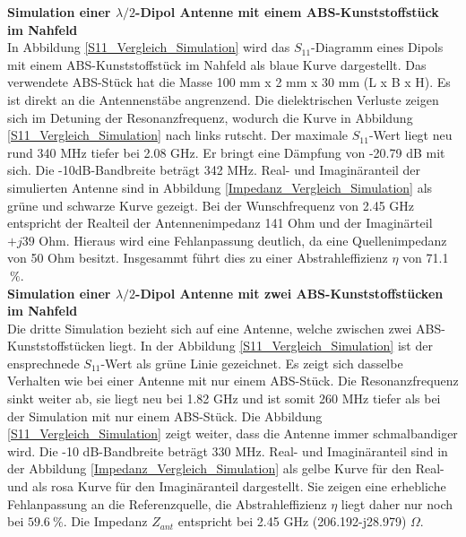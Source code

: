 \textbf{Simulation einer $\lambda/2$-Dipol Antenne mit einem ABS-Kunststoffstück im Nahfeld}\\
In Abbildung \ref{S11_Vergleich_Simulation} wird das $S_{11}$-Diagramm eines Dipols mit einem ABS-Kunststoffstück im Nahfeld als blaue Kurve dargestellt. Das verwendete ABS-Stück hat die Masse 100 mm x 2 mm x 30 mm (L x B x H). Es ist direkt an die Antennenstäbe angrenzend. Die dielektrischen Verluste zeigen sich im Detuning der Resonanzfrequenz, wodurch die Kurve in Abbildung \ref{S11_Vergleich_Simulation} nach links rutscht. Der maximale $S_{11}$-Wert liegt neu rund 340 MHz tiefer bei 2.08 GHz. Er bringt eine Dämpfung von -20.79 dB mit sich. Die -10dB-Bandbreite beträgt 342 MHz. Real- und Imaginäranteil der simulierten Antenne sind in Abbildung \ref{Impedanz_Vergleich_Simulation} als grüne und schwarze Kurve gezeigt. Bei der Wunschfrequenz von 2.45 GHz entspricht der Realteil der Antennenimpedanz 141 Ohm und der Imaginärteil  $+j39$ Ohm. Hieraus wird eine Fehlanpassung deutlich, da eine Quellenimpedanz von 50 Ohm besitzt. Insgesammt führt dies zu einer Abstrahleffizienz $\eta$ von 71.1$\ \%$.\\

\textbf{Simulation einer $\lambda/2$-Dipol Antenne mit zwei ABS-Kunststoffstücken im Nahfeld}\\
Die dritte Simulation bezieht sich auf eine Antenne, welche  zwischen zwei ABS-Kunststoffstücken liegt. In der Abbildung \ref{S11_Vergleich_Simulation} ist der ensprechnede $S_{11}$-Wert als grüne Linie gezeichnet. Es zeigt sich dasselbe Verhalten wie bei einer Antenne mit nur einem ABS-Stück. Die Resonanzfrequenz sinkt weiter ab, sie liegt neu bei 1.82 GHz und ist somit 260 MHz tiefer als bei der Simulation mit nur einem ABS-Stück. Die Abbildung \ref{S11_Vergleich_Simulation} zeigt weiter, dass die Antenne immer schmalbandiger wird. Die -10 dB-Bandbreite beträgt 330 MHz. Real- und Imaginäranteil sind in der Abbildung \ref{Impedanz_Vergleich_Simulation} als gelbe Kurve für den Real- und als rosa Kurve für den Imaginäranteil dargestellt. Sie zeigen eine erhebliche Fehlanpassung an die Referenzquelle, die Abstrahleffizienz $\eta$ liegt daher nur noch bei $59.6 \ \%$. Die Impedanz $Z_{ant}$ entspricht bei 2.45 GHz (206.192-j28.979) $\Omega$.\\




